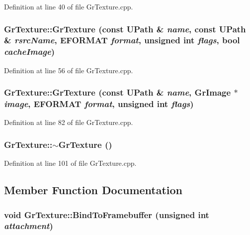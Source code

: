 Definition at line 40 of file GrTexture.cpp.\hypertarget{class_gr_texture_c134a41f404fb47416c5a0e374792737}{
\subsubsection[{GrTexture}]{\setlength{\rightskip}{0pt plus 5cm}GrTexture::GrTexture (const {\bf UPath} \& {\em name}, \/  const {\bf UPath} \& {\em rsrcName}, \/  {\bf EFORMAT} {\em format}, \/  unsigned int {\em flags}, \/  bool {\em cacheImage})}}
\label{class_gr_texture_c134a41f404fb47416c5a0e374792737}




Definition at line 56 of file GrTexture.cpp.\hypertarget{class_gr_texture_7705b602e3918639f58b799495529c68}{
\subsubsection[{GrTexture}]{\setlength{\rightskip}{0pt plus 5cm}GrTexture::GrTexture (const {\bf UPath} \& {\em name}, \/  {\bf GrImage} $\ast$ {\em image}, \/  {\bf EFORMAT} {\em format}, \/  unsigned int {\em flags})}}
\label{class_gr_texture_7705b602e3918639f58b799495529c68}




Definition at line 82 of file GrTexture.cpp.\hypertarget{class_gr_texture_13f13092919de67e0cfc6bd14cf94ca1}{
\subsubsection[{$\sim$GrTexture}]{\setlength{\rightskip}{0pt plus 5cm}GrTexture::$\sim$GrTexture ()}}
\label{class_gr_texture_13f13092919de67e0cfc6bd14cf94ca1}




Definition at line 101 of file GrTexture.cpp.

\subsection{Member Function Documentation}
\hypertarget{class_gr_texture_c0d44e0f407c06a8c3282e0325faaf87}{
\subsubsection[{BindToFramebuffer}]{\setlength{\rightskip}{0pt plus 5cm}void GrTexture::BindToFramebuffer (unsigned int {\em attachment})}}
\label{class_gr_texture_c0d44e0f407c06a8c3282e0325faaf87}




